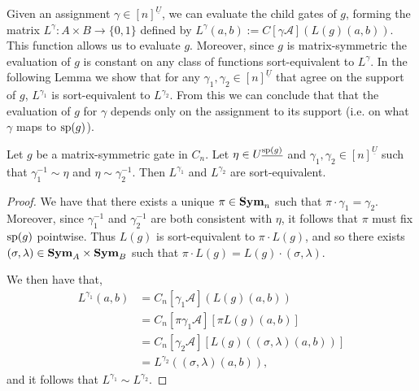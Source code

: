 \documentclass[../paper.tex]{subfiles}
\begin{document}

Given an assignment $\gamma \in [n]^{\underline{U}}$, we can evaluate the child
gates of $g$, forming the matrix $L^{\gamma} : A \times B \rightarrow \{0,1\}$
defined by $L^{\gamma} (a,b) := C[\gamma \mathcal{A}](L(g)(a,b))$. This function
allows us to evaluate $g$. Moreover, since $g$ is matrix-symmetric the
evaluation of $g$ is constant on any class of functions sort-equivalent to
$L^\gamma$. In the following Lemma we show that for any $\gamma_1, \gamma_2 \in
[n]^{\underline{U}}$ that agree on the support of $g$, $L^{\gamma_1}$ is
sort-equivalent to $L^{\gamma_2}$. From this we can conclude that that the
evaluation of $g$ for $\gamma$ depends only on the assignment to its support
(i.e. on what $\gamma$ maps to $\text{sp}(g)$).

\begin{lem}
  Let $g$ be a matrix-symmetric gate in $C_n$. Let $\eta \in
  U^{\underline{\text{sp}(g)}}$ and $\gamma_1, \gamma_2 \in [n]^{\underline{U}}$
  such that $\gamma^{-1}_1 \sim \eta$ and $\eta \sim \gamma^{-1}_2$. Then
  $L^{\gamma_1}$ and $L^{\gamma_2}$ are sort-equivalent.
  \label{lem:support-determines-evaluation}
\end{lem}

\begin{proof}
  We have that there exists a unique $\pi \in \text{\textbf{Sym}}_n$ such that $\pi \cdot
  \gamma_1 = \gamma_2$. Moreover, since $\gamma^{-1}_1$ and $\gamma^{-1}_2$ are
  both consistent with $\eta$, it follows that $\pi$ must fix $\text{sp}(g)$
  pointwise. Thus $L(g)$ is sort-equivalent to $\pi \cdot L(g)$, and so there
  exists $(\sigma, \lambda) \in \text{\textbf{Sym}}_A \times \text{\textbf{Sym}}_B$ such that $\pi \cdot L(g)
  = L(g) \cdot (\sigma, \lambda)$.

  We then have that,
  \begin{align*}
    L^{\gamma_1} (a,b) &= C_n[\gamma_1 \mathcal{A}](L(g)(a,b))\\
                       & = C_n[\pi \gamma_1 \mathcal{A}][\pi L(g)(a,b)] \\
                       & = C_n[\gamma_2 \mathcal{A}][L(g)((\sigma, \lambda)(a,b))]\\
                       & = L^{\gamma_2} ((\sigma, \lambda) (a,b)),
  \end{align*}
  and it follows that $L^{\gamma_1} \sim L^{\gamma_2}$.
\end{proof}
\end{document}
